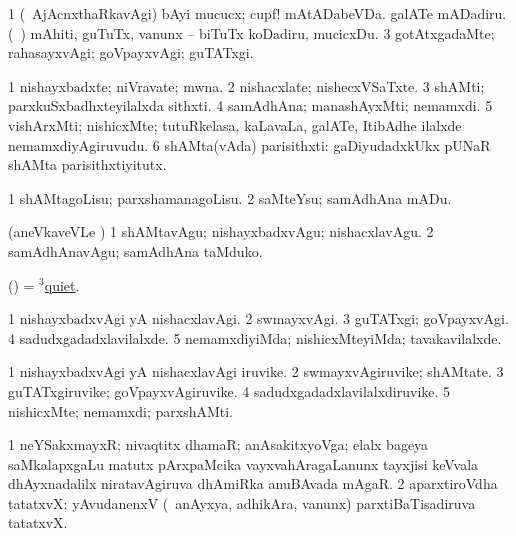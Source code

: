 \noindent
\gl{\pagu}
\bmng
\bnum
\num{1}  (\kanmu\ AjAcnxthaRkavAgi) bAyi mucucx; cupf! mAtADabeVDa. 
  
\banum
{} galATe mADadiru. 
 (\sA\ ) mAhiti, guTuTx, \mo vanunx -- biTuTx koDadiru, mucicxDu. 
\eanum
\numie
\num{3}  gotAtxgadaMte; rahasayxvAgi; goVpayxvAgi; guTATxgi. 
\enum
\emng
\eentry

\bentry
{}
\gl{\nA}
\bmng
\bnum
\num{1} nishayxbadxte; niVravate; mwna. 
\num{2} nishacxlate; nishecxVSaTxte. 
\num{3} shAMti; parxkuSxbadhxteyilalxda sithxti. 
\num{4} samAdhAna; manashAyxMti; nemamxdi. 
\num{5} vishArxMti; nishicxMte; tutuRkelasa, kaLavaLa, galATe, ItibAdhe ilalxde nemamxdiyAgiruvudu. 
\num{6} shAMta(vAda) parisithxti:  gaDiyudadxkUkx pUNaR shAMta parisithxtiyitutx. 
\enum
\emng
\eentry

\bentry
{}
\gl{\sakirx}
\bmng
\bnum
\num{1} shAMtagoLisu; parxshamanagoLisu. 
\num{2} saMteYsu; samAdhAna mADu. 
\enum
\emng

\noindent
\gl{\akirx}
\bmng
(aneVkaveVLe ) 
\bnum
\num{1} shAMtavAgu; nishayxbadxvAgu; nishacxlavAgu. 
\num{2} samAdhAnavAgu; samAdhAna taMduko. 
\enum
\emng
\eentry

\bentry
{}
\gl{\kirx}
\bmng
(\birx) = \hyperlink{quiet(3)}{$^3$quiet}. 
\emng
\eentry

\bentry
{}
\gl{\kirxvi}
\bmng
\bnum
\num{1} nishayxbadxvAgi yA nishacxlavAgi. 
\num{2} swmayxvAgi. 
\num{3} guTATxgi; goVpayxvAgi. 
\num{4} sadudxgadadxlavilalxde. 
\num{5} nemamxdiyiMda; nishicxMteyiMda; tavakavilalxde. 
\enum
\emng
\eentry

\bentry
{}
\gl{\nA}
\bmng
\bnum
\num{1} nishayxbadxvAgi yA nishacxlavAgi iruvike. 
\num{2} swmayxvAgiruvike; shAMtate. 
\num{3} guTATxgiruvike; goVpayxvAgiruvike. 
\num{4} sadudxgadadxlavilalxdiruvike. 
\num{5} nishicxMte; nemamxdi; parxshAMti. 
\enum
\emng
\eentry

\bentry
{}
\gl{\nA}
\bmng
\bnum
\num{1} neYSakxmayxR; nivaqtitx dhamaR; anAsakitxyoVga; elalx bageya saMkalapxgaLu matutx pArxpaMcika vayxvahAragaLanunx tayxjisi keVvala dhAyxnadalilx niratavAgiruva dhAmiRka anuBAvada mAgaR. 
\num{2} aparxtiroVdha tatatxvX; yAvudanenxV (\kanmu\ anAyxya, adhikAra, \mo vanunx) parxtiBaTisadiruva tatatxvX. 
\enum
\emng
\eentry

